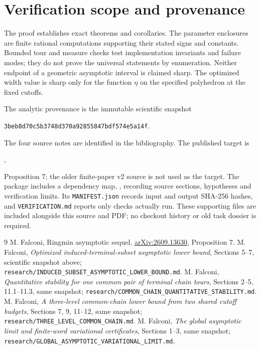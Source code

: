 \documentclass[11pt,a4paper]{article}
\theoremstyle{remark}\newtheorem{remark}[theorem]{Remark}
\begin{document}
\section{Verification scope and provenance}\label{sec:scope}
The proof establishes exact theorems and corollaries. The parameter
enclosures are finite rational computations supporting their stated
signs and constants. Bounded tour and measure checks test implementation
invariants and failure modes; they do not prove the universal statements
by enumeration. Neither endpoint of a geometric asymptotic interval is
claimed sharp. The optimized width value is sharp only for the function
$\eta$ on the specified polyhedron at the fixed cutoffs.

The analytic provenance is the immutable scientific snapshot
\begin{center}\small\texttt{3beb8d70c5b3748d370a92855847bdf574e5a14f}.\end{center}
The four source notes are identified in the bibliography. The published
target is\par\smallskip
{\small{}},\par\smallskip
Proposition 7; the older finite-paper v2 source is not used as the target.
The package includes a dependency map, , recording source sections,
hypotheses and verification limits. Its \texttt{MANIFEST.json} records
input and output SHA-256 hashes, and \texttt{VERIFICATION.md} reports
only checks actually run. These supporting files are included alongside
this source and PDF; no checkout history or old task dossier is required.

\begin{thebibliography}{9}\small
{} M. Falconi, Ringmin asymptotic sequel,
\href{https://arxiv.org/abs/2609.13630}{arXiv:2609.13630}, Proposition 7.
 M. Falconi, \emph{Optimized induced-terminal-subset
asymptotic lower bound}, Sections 5--7, scientific snapshot above;
\texttt{research/INDUCED\_SUBSET\_ASYMPTOTIC\_LOWER\_BOUND.md}.
 M. Falconi, \emph{Quantitative stability for one common
pair of terminal chain tours}, Sections 2--5, 11.1--11.3, same snapshot;
\texttt{research/COMMON\_CHAIN\_QUANTITATIVE\_STABILITY.md}.
 M. Falconi, \emph{A three-level common-chain lower bound
from two shared cutoff budgets}, Sections 7, 9, 11--12, same snapshot;
\texttt{research/THREE\_LEVEL\_COMMON\_CHAIN.md}.
 M. Falconi, \emph{The global asymptotic limit and finite-word
variational certificates}, Sections 1--3, same snapshot;
\texttt{research/GLOBAL\_ASYMPTOTIC\_VARIATIONAL\_LIMIT.md}.
\end{thebibliography}
\end{document}
